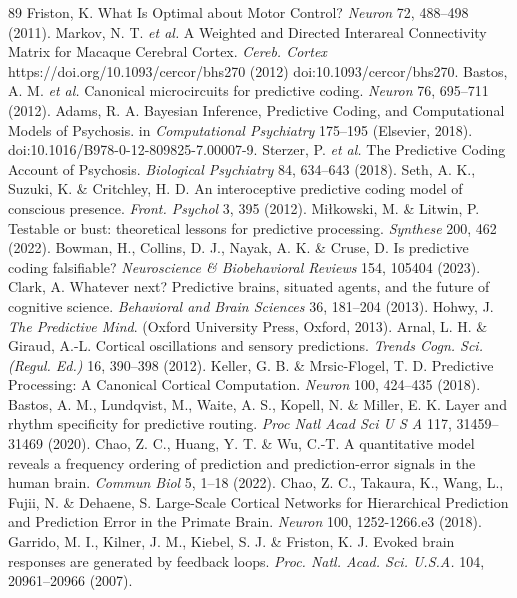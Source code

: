 \documentclass[12pt]{article}
\begin{document}
\begin{thebibliography}{89}
 Friston, K. What Is Optimal about Motor Control? \emph{Neuron} 72, 488--498 (2011).
 Markov, N. T. \emph{et al.} A Weighted and Directed Interareal Connectivity Matrix for Macaque Cerebral Cortex. \emph{Cereb. Cortex} https://doi.org/10.1093/cercor/bhs270 (2012) doi:10.1093/cercor/bhs270.
 Bastos, A. M. \emph{et al.} Canonical microcircuits for predictive coding. \emph{Neuron} 76, 695--711 (2012).
 Adams, R. A. Bayesian Inference, Predictive Coding, and Computational Models of Psychosis. in \emph{Computational Psychiatry} 175--195 (Elsevier, 2018). doi:10.1016/B978-0-12-809825-7.00007-9.
 Sterzer, P. \emph{et al.} The Predictive Coding Account of Psychosis. \emph{Biological Psychiatry} 84, 634--643 (2018).
 Seth, A. K., Suzuki, K. \& Critchley, H. D. An interoceptive predictive coding model of conscious presence. \emph{Front. Psychol} 3, 395 (2012).
 Miłkowski, M. \& Litwin, P. Testable or bust: theoretical lessons for predictive processing. \emph{Synthese} 200, 462 (2022).
 Bowman, H., Collins, D. J., Nayak, A. K. \& Cruse, D. Is predictive coding falsifiable? \emph{Neuroscience \& Biobehavioral Reviews} 154, 105404 (2023).
 Clark, A. Whatever next? Predictive brains, situated agents, and the future of cognitive science. \emph{Behavioral and Brain Sciences} 36, 181--204 (2013).
 Hohwy, J. \emph{The Predictive Mind}. (Oxford University Press, Oxford, 2013).
 Arnal, L. H. \& Giraud, A.-L. Cortical oscillations and sensory predictions. \emph{Trends Cogn. Sci. (Regul. Ed.)} 16, 390--398 (2012).
 Keller, G. B. \& Mrsic-Flogel, T. D. Predictive Processing: A Canonical Cortical Computation. \emph{Neuron} 100, 424--435 (2018).
 Bastos, A. M., Lundqvist, M., Waite, A. S., Kopell, N. \& Miller, E. K. Layer and rhythm specificity for predictive routing. \emph{Proc Natl Acad Sci U S A} 117, 31459--31469 (2020).
 Chao, Z. C., Huang, Y. T. \& Wu, C.-T. A quantitative model reveals a frequency ordering of prediction and prediction-error signals in the human brain. \emph{Commun Biol} 5, 1--18 (2022).
 Chao, Z. C., Takaura, K., Wang, L., Fujii, N. \& Dehaene, S. Large-Scale Cortical Networks for Hierarchical Prediction and Prediction Error in the Primate Brain. \emph{Neuron} 100, 1252-1266.e3 (2018).
 Garrido, M. I., Kilner, J. M., Kiebel, S. J. \& Friston, K. J. Evoked brain responses are generated by feedback loops. \emph{Proc. Natl. Acad. Sci. U.S.A.} 104, 20961--20966 (2007).

\end{thebibliography}
\end{document}
